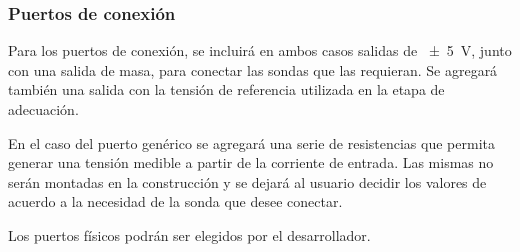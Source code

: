 \documentclass[../et.tex]{subfiles}
\begin{document}
  \subsubsection{Puertos de conexión}
  Para los puertos de conexión, se incluirá en ambos casos salidas de \SI{\pm 5}{V}, junto con una salida de masa, para conectar las sondas que las requieran. Se agregará también una salida con la tensión de referencia utilizada en la etapa de adecuación.

  En el caso del puerto genérico se agregará una serie de resistencias que permita generar una tensión medible a partir de la corriente de entrada. Las mismas no serán montadas en la construcción y se dejará al usuario decidir los valores de acuerdo a la necesidad de la sonda que desee conectar.

  Los puertos físicos podrán ser elegidos por el desarrollador.
\end{document}
